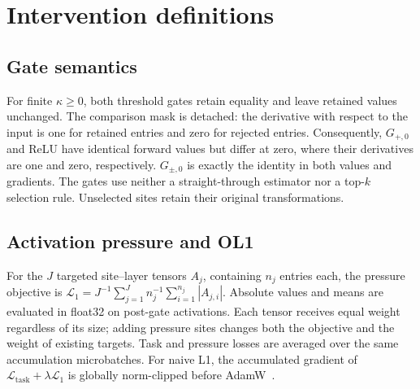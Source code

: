 \section{Intervention definitions}
\label{app:interventions}

\subsection{Gate semantics}

For finite $\kappa\geq0$, both threshold gates retain equality and leave retained values unchanged.
The comparison mask is detached: the derivative with respect to the input
is one for retained entries and zero for rejected entries. Consequently,
$G_{+,0}$ and ReLU have identical forward values but differ at zero, where
their derivatives are one and zero, respectively. $G_{\pm,0}$ is exactly the
identity in both values and gradients. The gates use neither a straight-through
estimator nor a top-$k$ selection rule. Unselected sites retain their original transformations.

\subsection{Activation pressure and OL1}
\label{app:pressure}

For the $J$ targeted site--layer tensors $A_j$, containing $n_j$ entries each,
the pressure objective is
$\mathcal{L}_1=J^{-1}\sum_{j=1}^{J}n_j^{-1}\sum_{i=1}^{n_j}|A_{j,i}|$.
Absolute values and means are evaluated in float32 on post-gate activations.
Each tensor receives equal weight regardless of its size; adding pressure
sites changes both the objective and the weight of existing targets.
Task and pressure losses are averaged over the same accumulation microbatches.
For naive L1, the accumulated gradient of
$\mathcal{L}_{\mathrm{task}}+\lambda\mathcal{L}_1$ is globally norm-clipped
before AdamW~\citep{loshchilov2019adamw}.


